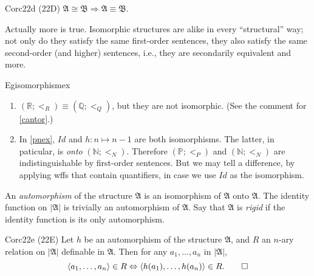 \begin{reference}{Cor}{c22d}
  (22D) $\mathfrak{A}\cong \mathfrak{B}\Rightarrow \mathfrak{A}\equiv \mathfrak{B}$.
\end{reference}

Actually more is true. Isomorphic structures are alike in every “structural” way; not only do they satisfy the same first-order sentences, they also satisfy the same second-order (and higher) sentences, i.e., they are secondarily equivalent and more.

\begin{reference}{Eg}{isomorphismex}
  \begin{enumerate}
    \item $(\mathbb{R};<_R)\equiv(\mathbb{Q};<_Q)$, but they are not isomorphic. (See the comment for \ref{cantor}.)
    \item In \ref{pnex}, $Id$ and $h: n\mapsto n-1$ are both isomorphisms. The latter, in paticular, is \textit{onto} $(\mathbb{N};<_N)$. Therefore $(\mathbb{P};<_P)$ and $(\mathbb{N};<_N)$ are indistinguishable by first-order sentences. But we may tell a difference, by applying wffs that contain quantifiers, in case we use $Id$ as the isomorphism.\qedhere
  \end{enumerate}
\end{reference}

An \textit{automorphism} of the structure $\mathfrak{A}$ is an isomorphism of $\mathfrak{A}$ onto $\mathfrak{A}$. The identity function on $|\mathfrak{A}|$ is trivially an automorphism of $\mathfrak{A}$. Say that $\mathfrak{A}$ is \textit{rigid} if the identity function is its only automorphism.

\begin{reference}{Cor}{c22e}
  (22E) Let $h$ be an automorphism of the structure $\mathfrak{A}$, and $R$ an $n$-ary relation on $|\mathfrak{A}|$ definable in $\mathfrak{A}$. Then for any $a_1,\dots,a_n$ in $|\mathfrak{A}|$,
  \[
    \langle a_1,\dots,a_n\rangle\in R\Leftrightarrow\langle h(a_1),\dots,h(a_n)\rangle\in R.\qedhere
  \]
\end{reference}

